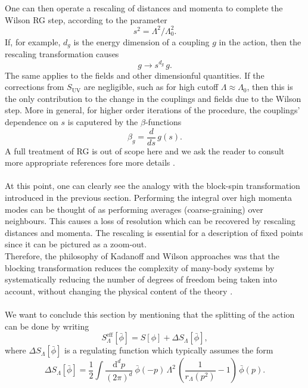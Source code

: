 One can then operate a rescaling of distances and momenta to complete the Wilson RG step, according to the parameter 
\begin{equation*}
    s^2 = \Lambda^2 / \Lambda_0^2.
\end{equation*}
If, for example, $d_g$ is the energy dimension of a coupling $g$ in the action, then the rescaling transformation causes 
\begin{equation*} 
    g \to s^{d_g} \, g.
\end{equation*}
The same applies to the fields and other dimensionful quantities. If the corrections from $S_\text{UV}$ are negligible, such as for high cutoff $\Lambda \approx \Lambda_0$, then this is the only contribution to the change in the couplings and fields due to the Wilson step. More in general, for higher order iterations of the procedure, the couplings' dependence on $s$ is caputered by the $\beta$-functions 
\begin{equation*}
    \beta_g = \frac{d}{ds} \, g(s).
\end{equation*}
A full treatment of RG is out of scope here and we ask the reader to consult more appropriate references fore more details \cite{Peskin:1995ev}. \\~\\
At this point, one can clearly see the analogy with the block-spin transformation introduced in the previous section. Performing the integral over high momenta modes
can be thought of as performing averages (coarse-graining) over neighbours. This causes a loss of resolution which can be recovered by rescaling distances and momenta. The rescaling is essential for a description of fixed points since it can be pictured as a zoom-out. \\
Therefore, the philosophy of Kadanoff and Wilson approaches was that the blocking transformation reduces the complexity of many-body systems by systematically reducing the number of degrees of freedom being taken into account, without changing the physical content of the
theory \cite{WILSON197475,carosso2020novel}. \\~\\
We want to conclude this section by mentioning that the splitting of the action can be done by writing
\begin{equation*}
    S^\text{eff}_\Lambda[\bar\phi] = S[\phi] + \Delta S_{\Lambda}[\bar\phi],
\end{equation*}
where $\Delta S_{\Lambda}[\bar{\phi}]$ is a regulating function which typically assumes the form
\begin{equation} 
    \Delta S_{\Lambda}[\bar\phi] = \frac{1}{2} \int \frac{\mathrm{d}^d p}{(2 \pi)^d}  \ \bar\phi(-p) \, \Lambda^2 \, \left(\frac{1}{r_{\Lambda}(p^2)}-1\right) \, \bar\phi(p).
    \label{eq:frg_action}
\end{equation}
